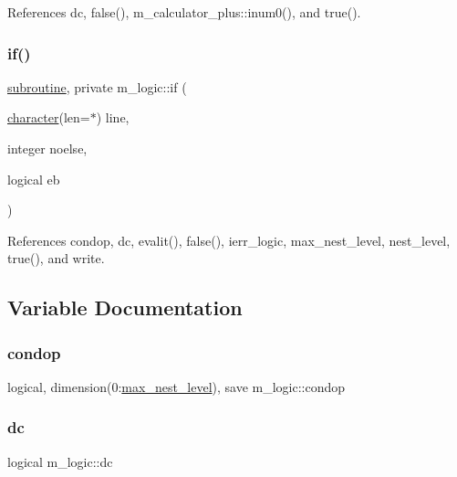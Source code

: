 References dc, false(), m\+\_\+calculator\+\_\+plus\+::inum0(), and true().

\mbox{\label{namespacem__logic_a2229d0129ded7d8a34fce60334bc5938}} 
\subsubsection{\texorpdfstring{if()}{if()}}
{\footnotesize\ttfamily \hyperlink{M__stopwatch_83_8txt_acfbcff50169d691ff02d4a123ed70482}{subroutine}, private m\+\_\+logic\+::if (\begin{DoxyParamCaption}\item[{\hyperlink{option__stopwatch_83_8txt_abd4b21fbbd175834027b5224bfe97e66}{character}(len=$\ast$)}]{line,  }\item[{integer}]{noelse,  }\item[{logical}]{eb }\end{DoxyParamCaption})\hspace{0.3cm}{\ttfamily [private]}}



References condop, dc, evalit(), false(), ierr\+\_\+logic, max\+\_\+nest\+\_\+level, nest\+\_\+level, true(), and write.



\subsection{Variable Documentation}
\mbox{\label{namespacem__logic_ad7573389be889c19d1496dc2e9dff9a1}} 
\subsubsection{\texorpdfstring{condop}{condop}}
{\footnotesize\ttfamily logical, dimension(0\+:\hyperlink{namespacem__logic_a22ef0b94ebd8b7f3b35a33c8d9250759}{max\+\_\+nest\+\_\+level}), save m\+\_\+logic\+::condop\hspace{0.3cm}{\ttfamily [private]}}

\mbox{\label{namespacem__logic_ac3811d1cc267a1241feb5f77905110a2}} 
\subsubsection{\texorpdfstring{dc}{dc}}
{\footnotesize\ttfamily logical m\+\_\+logic\+::dc\hspace{0.3cm}{\ttfamily [private]}}

